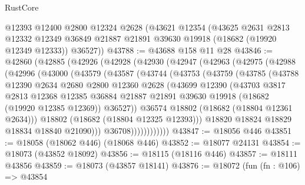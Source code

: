 \begin{lexlean}{RustCore}
\begin{coremodule}
    @12393
    @12400
    @2800
    @12324
    @2628
    (@43621
      @12354
      (@43625
        @2631
        @2813
        @12332
        @12349
        @36849
        @21887
        @21891
        @39630
        @19918
        (@18682 (@19920 @12349 @12333))
        @36527))
@43788 := @43688 @158 @11 @28
@43846 := @42860
    (@42885
      (@42926
        (@42928
          (@42930
            (@42947
              (@42963
                (@42975
                  (@42988
                    (@42996
                      (@43000
                        (@43579
                          (@43587
                            (@43744
                              (@43753
                                (@43759
                                  (@43785
                                    (@43788
                                      @12390
                                      @2634
                                      @2680
                                      @2800
                                      @12360
                                      @2628
                                      (@43699
                                        @12390
                                        (@43703
                                          @3817
                                          @2813
                                          @12368
                                          @12385
                                          @36884
                                          @21887
                                          @21891
                                          @39630
                                          @19918
                                          (@18682 (@19920 @12385 @12369))
                                          @36527))
                                      @36574
                                      @18802
                                      (@18682 (@18804 @12361 @2634)))
                                    @18802
                                    (@18682 (@18804 @12325 @12393)))
                                  @18820
                                  @18824
                                  @18829
                                  @18834
                                  @18840
                                  @21090)))
                            @36708))))))))))))
@43847 := @18056 @446
@43851 := @18058 (@18062 @446) (@18068 @446)
@43852 := @18077 @24131
@43854 := @18073 (@43852 @18092)
@43856 := @18115 (@18116 @446)
@43857 := @18111 @43856
@43859 := @18073 (@43857 @18141)
@43876 := @18072
    (fun (fn : @106) =>
    @43854

\end{coremodule}
\end{lexlean}
